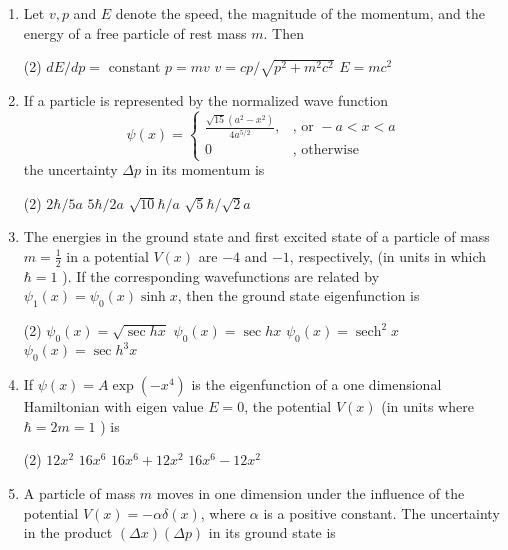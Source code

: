\begin{enumerate}
		\item Let $v, p$ and $E$ denote the speed, the magnitude of the momentum, and the energy of a free particle of rest mass $m$. Then
		{}
	\begin{tasks}(2)
		\task[\textbf{A.}] $d E / d p=$ constant
		\task[\textbf{B.}]$p=m v$
		\task[\textbf{C.}]$v=c p / \sqrt{p^{2}+m^{2} c^{2}}$
		\task[\textbf{D.}] $E=m c^{2}$
	\end{tasks}
	\item If a particle is represented by the normalized wave function
	$$
	\psi(x)= \begin{cases}\frac{\sqrt{15}\left(a^{2}-x^{2}\right)}{4 a^{5 / 2}}, & \text {, or }-a<x<a \\ 0 & , \text { otherwise }\end{cases}
	$$
	the uncertainty $\Delta p$ in its momentum is
	{}
\begin{tasks}(2)
	\task[\textbf{A.}] $2 \hbar / 5 a$
	\task[\textbf{B.}] $5 \hbar / 2 a$
	\task[\textbf{C.}]$\sqrt{10} \hbar / a$
	\task[\textbf{D.}]$\sqrt{5} \hbar / \sqrt{2} a$
\end{tasks}
		\item The energies in the ground state and first excited state of a particle of mass $m=\frac{1}{2}$ in a potential $V(x)$ are $-4$ and $-1$, respectively, (in units in which $\hbar=1$ ). If the corresponding wavefunctions are related by $\psi_{1}(x)=\psi_{0}(x) \sinh x$, then the ground state eigenfunction is
		{}
	\begin{tasks}(2)
		\task[\textbf{A.}] $\psi_{0}(x)=\sqrt{\sec h x}$
		\task[\textbf{B.}]$\psi_{0}(x)=\sec h x$
		\task[\textbf{C.}]$\psi_{0}(x)=\operatorname{sech}^{2} x$
		\task[\textbf{D.}]$\psi_{0}(x)=\sec h^{3} x$
	\end{tasks}
	\item If $\psi(x)=A \exp \left(-x^{4}\right)$ is the eigenfunction of a one dimensional Hamiltonian with eigen value $E=0$, the potential $V(x)$ (in units where $\hbar=2 m=1$ ) is
	{}
\begin{tasks}(2)
	\task[\textbf{A.}] $12 x^{2}$
	\task[\textbf{B.}]$16 x^{6}$
	\task[\textbf{C.}]$16 x^{6}+12 x^{2}$
	\task[\textbf{D.}]$16 x^{6}-12 x^{2}$
\end{tasks}
	\item A particle of mass $m$ moves in one dimension under the influence of the potential $V(x)=-\alpha \delta(x)$, where $\alpha$ is a positive constant. The uncertainty in the product $(\Delta x)(\Delta p)$ in its ground state is

\end{enumerate}
